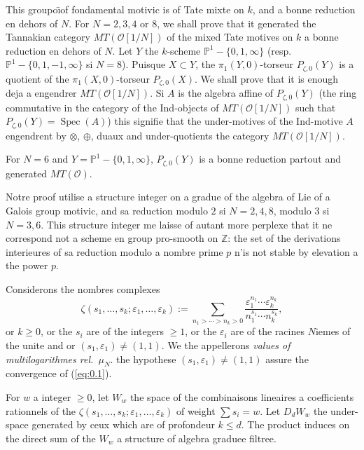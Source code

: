 \documentclass[11pt,a4paper]{article}
\theoremstyle{plain}
\theoremstyle{definition}
\DeclareMathOperator{\Spec}{Spec}
\newcommand{\Z}{\mathbb{Z}}
\newcommand{\Pone}{\mathbb{P}^1}
\begin{document}
This groupo\"{\i}of fondamental motivic is of Tate mixte on $k$, and a bonne reduction en dehors of $N$. For $N = 2,3,4$ or $8$, we shall prove that it generated the Tannakian category $MT(\mathcal{O}[1/N])$ of the mixed Tate motives on $k$ a bonne reduction en dehors of $N$. Let $Y$ the $k$-scheme $\Pone - \{0,1,\infty\}$ (resp.~$\Pone - \{0,1,-1,\infty\}$ si $N=8$). Puisque $X \subset Y$, the $\pi_1(Y,0)$-torseur $P_{\zeta,0}(Y)$ is a quotient of the $\pi_1(X,0)$-torseur $P_{\zeta,0}(X)$. We shall prove that it is enough deja a engendrer $MT(\mathcal{O}[1/N])$. Si $A$ is the algebra affine of $P_{\zeta,0}(Y)$ (the ring commutative in the category of the Ind-objects of $MT(\mathcal{O}[1/N])$ such that $P_{\zeta,0}(Y) = \Spec(A)$) this signifie that the under-motives of the Ind-motive $A$ engendrent by $\otimes$, $\oplus$, duaux and under-quotients the category $MT(\mathcal{O}[1/N])$.

For $N=6$ and $Y = \Pone - \{0,1,\infty\}$, $P_{\zeta,0}(Y)$ is a bonne reduction partout and generated $MT(\mathcal{O})$.

Notre proof utilise a structure integer on a gradue of the algebra of Lie of a Galois group motivic, and sa reduction modulo $2$ si $N=2,4,8$, modulo $3$ si $N=3,6$. This structure integer me laisse of autant more perplexe that it ne correspond not a scheme en group pro-smooth on $\Z$: the set of the derivations interieures of sa reduction modulo a nombre prime $p$ n'is not stable by elevation a the power $p$.

Considerons the nombres complexes
\begin{equation}
\label{eq:0.1}
\zeta(s_1,\ldots,s_k; \varepsilon_1,\ldots,\varepsilon_k) := \sum_{n_1 > \cdots > n_k > 0} \frac{\varepsilon_1^{n_1} \cdots \varepsilon_k^{n_k}}{n_1^{s_1} \cdots n_k^{s_k}},
\end{equation}
or $k \geq 0$, or the $s_i$ are of the integers $\geq 1$, or the $\varepsilon_i$ are of the racines $N$iemes of the unite and or $(s_1, \varepsilon_1) \neq (1,1)$. We the appellerons {\em values of multilogarithmes rel.~$\mu_N$}. the hypothese $(s_1,\varepsilon_1) \neq (1,1)$ assure the convergence of (\ref{eq:0.1}).

For $w$ a integer $\geq 0$, let $W_w$ the space of the combinaisons lineaires a coefficients rationnels of the $\zeta(s_1,\ldots,s_k; \varepsilon_1,\ldots,\varepsilon_k)$ of weight $\sum s_i = w$. Let $D_d W_w$ the under-space generated by ceux which are of profondeur $k \leq d$. The product induces on the direct sum of the $W_w$ a structure of algebra graduee filtree.
\end{document}
